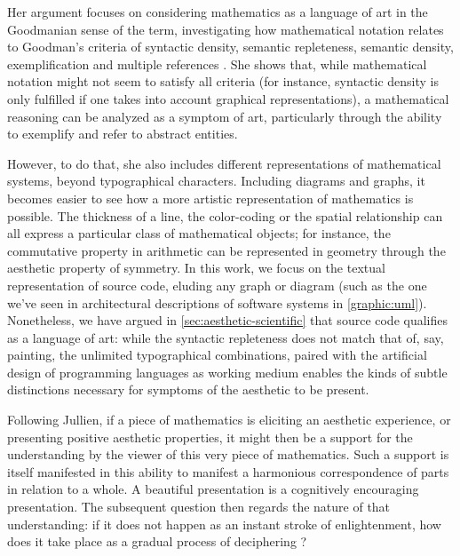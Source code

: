 Her argument focuses on considering mathematics as a language of art in the Goodmanian sense of the term, investigating how mathematical notation relates to Goodman's criteria of syntactic density, semantic repleteness, semantic density, exemplification and multiple references \citep{jullien_languages_2012}. She shows that, while mathematical notation might not seem to satisfy all criteria (for instance, syntactic density is only fulfilled if one takes into account graphical representations), a mathematical reasoning can be analyzed as a symptom of art, particularly through the ability to exemplify and refer to abstract entities.

However, to do that, she also includes different representations of mathematical systems, beyond typographical characters. Including diagrams and graphs, it becomes easier to see how a more artistic representation of mathematics is possible. The thickness of a line, the color-coding or the spatial relationship can all express a particular class of mathematical objects; for instance, the commutative property in arithmetic can be represented in geometry through the aesthetic property of symmetry. In this work, we focus on the textual representation of source code, eluding any graph or diagram (such as the one we've seen in architectural descriptions of software systems in \ref{graphic:uml}). Nonetheless, we have argued in \ref{sec:aesthetic-scientific} that source code qualifies as a language of art: while the syntactic repleteness does not match that of, say, painting, the unlimited typographical combinations, paired with the artificial design of programming languages as working medium enables the kinds of subtle distinctions necessary for symptoms of the aesthetic to be present.

Following Jullien, if a piece of mathematics is eliciting an aesthetic experience, or presenting positive aesthetic properties, it might then be a support for the understanding by the viewer of this very piece of mathematics. Such a support is itself manifested in this ability to manifest a harmonious correspondence of parts in relation to a whole. A beautiful presentation is a cognitively encouraging presentation. The subsequent question then regards the nature of that understanding: if it does not happen as an instant stroke of enlightenment, how does it take place as a gradual process of deciphering \citep{rota_phenomenology_1997}?

